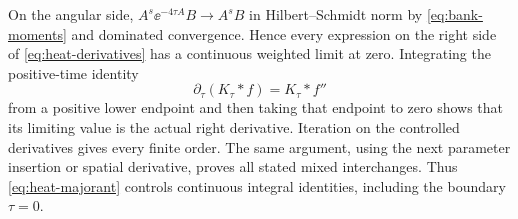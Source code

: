 On the angular side,
$A^s\ee^{-4\tau A}B\to A^sB$ in Hilbert--Schmidt norm by
\eqref{eq:bank-moments} and dominated convergence. Hence every
expression on the right side of \eqref{eq:heat-derivatives} has a
continuous weighted limit at zero. Integrating the positive-time
identity
\begin{equation*}
 \partial_\tau(K_\tau*f)=K_\tau*f''
\end{equation*}
from a positive lower endpoint and then taking that endpoint to zero
shows that its limiting value is the actual right derivative. Iteration
on the controlled derivatives gives every finite order. The same
argument, using the next parameter insertion or spatial derivative,
proves all stated mixed interchanges. Thus
\eqref{eq:heat-majorant} controls continuous integral identities,
including the boundary $\tau=0$.
